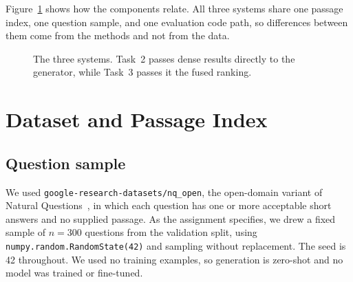 \documentclass[11pt,a4paper]{article}
\begin{document}
Figure~\ref{fig:pipeline} shows how the components relate. All three systems share one passage index, one question sample, and one evaluation code path, so differences between them come from the methods and not from the data.

\begin{figure}[ht]
\centering
{}
\caption{The three systems. Task~2 passes dense results directly to the generator, while Task~3 passes it the fused ranking.}
\label{fig:pipeline}
\end{figure}

\section{Dataset and Passage Index}

\subsection{Question sample}
We used \texttt{google-research-datasets/nq\_open}, the open-domain variant of Natural Questions~\cite{nq,orqa}, in which each question has one or more acceptable short answers and no supplied passage. As the assignment specifies, we drew a fixed sample of $n=300$ questions from the validation split, using \texttt{numpy.random.RandomState(42)} and sampling without replacement. The seed is 42 throughout. We used no training examples, so generation is zero-shot and no model was trained or fine-tuned.
\end{document}
